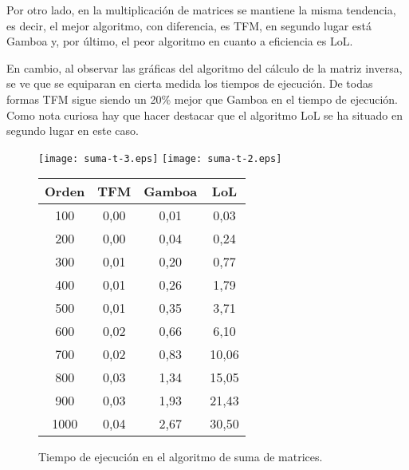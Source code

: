 \documentclass[a4paper,10pt]{article}
\begin{document}
Por otro lado, en la multiplicación de matrices se mantiene la misma tendencia, es decir, el mejor algoritmo, con diferencia, es TFM, en segundo lugar está Gamboa y, por último, el peor algoritmo en cuanto a eficiencia es LoL. 

\par \vspace{10pt}

En cambio, al observar las gráficas del algoritmo del cálculo de la matriz inversa, se ve que se equiparan en cierta medida los tiempos de ejecución. De todas formas TFM sigue siendo un 20\% mejor que Gamboa en el tiempo de ejecución. Como nota curiosa hay que hacer destacar que el algoritmo LoL se ha situado en segundo lugar en este caso.

\newpage
\begin{figure}[H]
\begin{center}
	\texttt{[image: suma-t-3.eps]}	
	\texttt{[image: suma-t-2.eps]}	
\begin{tabular}{||c|c|c|c||}
\hline
\textbf{Orden} & \textbf{TFM} & \textbf{Gamboa} & \textbf{LoL} \\
\hline
100 &	0,00 &	0,01 &	0,03 \\
200 &	0,00 &  0,04 & 0,24 \\
300 &	0,01 &	0,20 &	0,77 \\
400 &	0,01 &	0,26 &	1,79 \\
500 &	0,01 &	0,35 &	3,71 \\
600 &	0,02 &	0,66 &	6,10 \\
700 &	0,02 &	0,83 &	10,06 \\
800 &	0,03 &	1,34 &	15,05 \\
900 &	0,03 &	1,93 &	21,43 \\
1000 &	0,04 &	2,67 &	30,50 \\
\hline
\end{tabular}
\end{center}
\caption{Tiempo de ejecución en el algoritmo de suma de matrices.}
\end{figure}
\end{document}
